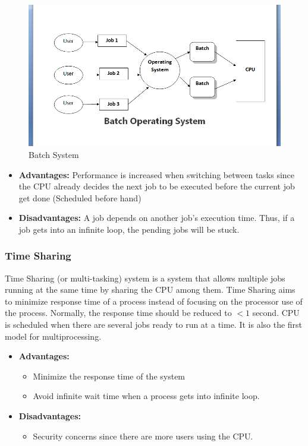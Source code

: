 \documentclass[a4paper]{article}
\begin{document}
\begin{figure}[ht]
    \centering
    \includegraphics[scale=0.5]{BatchSystem}
    \caption{Batch System}
\end{figure}

\begin{itemize}
    \item
    \textbf{Advantages:} Performance is increased when switching between tasks since the CPU already decides the next job to be executed before the current job get done (Scheduled before hand)
    \item
    \textbf{Disadvantages:} A job depends on another job's execution time. Thus, if a job gets into an infinite loop, the pending jobs will be stuck.
\end{itemize}

\subsubsection{Time Sharing}
Time Sharing (or multi-tasking) system is a system that allows multiple jobs running at the same time by sharing the CPU among them. Time Sharing aims to minimize response time of a process instead of focusing on the processor use of the process. Normally, the response time should be reduced to $< 1$ second. CPU is scheduled when there are several jobs ready to run at a time. It is also the first model for multiprocessing.

\begin{itemize}
    \item \textbf{Advantages:}
        \begin{itemize}
            \item Minimize the response time of the system
            \item Avoid infinite wait time when a process gets into infinite loop.
        \end{itemize}
    \item \textbf{Disadvantages:}
        \begin{itemize}
            \item Security concerns since there are more users using the CPU.\\
        \end{itemize}
\end{itemize}
\end{document}
